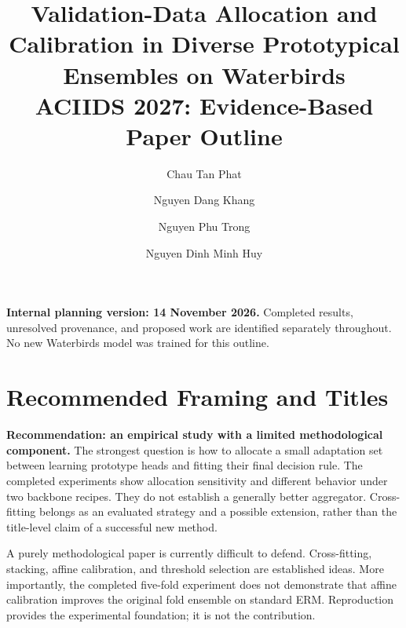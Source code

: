\documentclass[runningheads]{llncs}
\begin{document}
\title{Validation-Data Allocation and Calibration in Diverse Prototypical Ensembles on Waterbirds\\[3pt]
\large ACIIDS 2027: Evidence-Based Paper Outline}
\author{Chau Tan Phat \and Nguyen Dang Khang \and
Nguyen Phu Trong \and Nguyen Dinh Minh Huy}
\maketitle
\noindent\textbf{Internal planning version: 14 November 2026.} Completed results, unresolved provenance, and proposed work are identified separately throughout. No new Waterbirds model was trained for this outline.

\section{Recommended Framing and Titles}
\textbf{Recommendation: an empirical study with a limited methodological component.}
The strongest question is how to allocate a small adaptation set between learning prototype heads and fitting their final decision rule. The completed experiments show allocation sensitivity and different behavior under two backbone recipes. They do not establish a generally better aggregator. Cross-fitting belongs as an evaluated strategy and a possible extension, rather than the title-level claim of a successful new method.

A purely methodological paper is currently difficult to defend. Cross-fitting, stacking, affine calibration, and threshold selection are established ideas. More importantly, the completed five-fold experiment does not demonstrate that affine calibration improves the original fold ensemble on standard ERM. Reproduction provides the experimental foundation; it is not the contribution.
\end{document}
